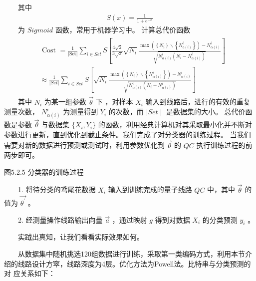 \documentclass[a4paper,11pt,english]{sphinxmanual}
\begin{document}
\sphinxAtStartPar
  其中
\begin{equation*}
\begin{split}S(x)=\frac{1}{1+e^{-x}}\end{split}
\end{equation*}
\sphinxAtStartPar
  为  \(Sigmoid\) 函数，常用于机器学习中。 计算总代价函数
\begin{equation*}
\begin{split}\begin{array}{r} &\text { Cost }=\frac{1}{|\text{Set}|} \sum_{i \in Set} S\left[\frac{4 \sqrt{2}}{3 \sqrt{\pi}} \sqrt{N_{i}} \frac{\max \left(\left\{N_{i}\right\} \backslash\left\{N_{a(i)}^{i}\right\}\right)-N_{\alpha(i)}^{i}}{\sqrt{N_{\alpha(i)}^{i}\left(N_{i}-N_{\alpha(i)}^{i}\right)}}\right] \\ &\approx \frac{1}{|S e t|} \sum_{i \in S e t} S\left[\sqrt{N_{i}} \frac{\max \left(\left\{N_{i}\right\} \backslash\left\{N_{\alpha(i)}^{i}\right\}\right)-N_{\alpha(i)}^{i}}{\sqrt{N_{\alpha(i)}^{i}\left(N_{i}-N_{\alpha(i)}^{i}\right)}}\right] \end{array}\end{split}
\end{equation*}
\sphinxAtStartPar
  其中 \(N_{i}\) 为某一组参数 \(\vec{\theta}\) 下 ，对样本 \(X_{i}\) 输入到线路后，进行的有效的重复测量次数， \(N_{\alpha(i)}^{i}\) 为测量得到 \(Y_{i}\) 的次数，而 \(\mid Set\mid\) 是数据集的大小。 总代价函数是参数 \(\vec{\theta}\) 与数据集 \(\{X_{i}, Y_{i}\}\) 的函数，利用经典计算机对其采取最小化并不断对参数进行更新，直到优化到截止条件。我们完成了对分类器的训练过程。 当我们需要对新的数据进行预测或测试时，利用参数优化到 \(\vec{\theta}\) 的 \(Q C\) 执行训练过程的前两步即可。


\begin{center}图5.2.5 分类器的训练过程
\end{center}
\sphinxAtStartPar
  1. 将待分类的鸢尾花数据 \(X_{i}\) 输入到训练完成的量子线路  \(Q C\) 中，其中  \(\vec{\theta}\) 的值为  \(\vec{\theta^{'}}\) 。

\sphinxAtStartPar
  2. 经测量操作线路输出向量 \(\vec{a}\) ，通过映射  \(g\) 得到对数据  \(X_{i}\) 的分类预测  \(y_{i}\) 。

\sphinxAtStartPar
  实䟠出真知，让我们看看实际效果如何。

\sphinxAtStartPar
  从数据集中随机挑选120组数据进行训练，采取第一类编码方式，利用本节介绍的线路设计方窣，线路深度为4层。优化方法为Powell法。比特串与分类预测的对 应关系如下：
\end{document}
